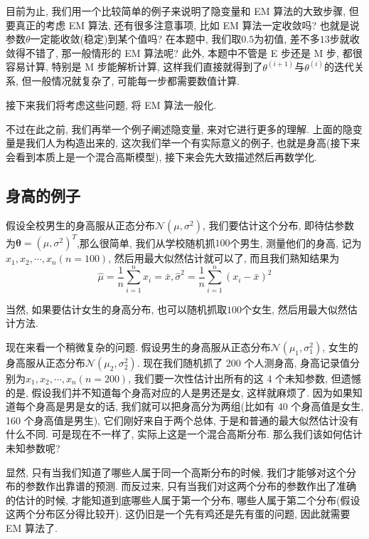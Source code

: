 \documentclass[a4paper,UTF8]{ctexart}
\theoremstyle{plain} \newtheorem{theorem}{定理}[section]
\theoremstyle{plain} \newtheorem{definition}{定义}[section]
\theoremstyle{plain} \newtheorem{lemma}{引理}[section]
\theoremstyle{plain} \newtheorem{proposition}{命题}[section]
\theoremstyle{plain} \newtheorem{example}{例}
\theoremstyle{plain} \newtheorem{remark}{注}
\theoremstyle{plain} \newtheorem{corollary}{推论}[section]
\begin{document}
目前为止, 我们用一个比较简单的例子来说明了隐变量和 EM 算法的大致步骤, 但要真正的考虑 EM 算法, 还有很多注意事项, 比如 EM 算法一定收敛吗? 也就是说参数$\theta$一定能收敛(稳定)到某个值吗? 在本题中, 我们取$0.5$为初值, 差不多$13$步就收敛得不错了, 那一般情形的 EM 算法呢? 此外, 本题中不管是 E 步还是 M 步, 都很容易计算, 特别是 M 步能解析计算, 这样我们直接就得到了$\theta^{(i + 1)}$与$\theta^{(i)}$的迭代关系, 但一般情况就复杂了, 可能每一步都需要数值计算.

接下来我们将考虑这些问题, 将 EM 算法一般化.

不过在此之前, 我们再举一个例子阐述隐变量, 来对它进行更多的理解. 上面的隐变量是我们人为构造出来的, 这次我们举一个有实际意义的例子, 也就是身高(接下来会看到本质上是一个混合高斯模型), 接下来会先大致描述然后再数学化.

\subsection{身高的例子}

假设全校男生的身高服从正态分布$\mathcal{N}(\mu, \sigma^{2})$, 我们要估计这个分布, 即待估参数为$\bm{\theta} = (\mu, \sigma^{2})^{T}$,那么很简单, 我们从学校随机抓$100$个男生, 测量他们的身高, 记为$x_{1}, x_{2}, \cdots, x_{n}(n=100)$, 然后用最大似然估计就可以了, 而且我们熟知结果为
\begin{equation*}
\hat{\mu} = \frac{1}{n} \sum_{i=1}^{n} x_{i} = \bar{x}, \hat{\sigma}^{2} = \frac{1}{n} \sum_{i=1}^{n} (x_{i}-\bar{x})^{2}
\end{equation*}

当然, 如果要估计女生的身高分布, 也可以随机抓取$100$个女生, 然后用最大似然估计方法.

现在来看一个稍微复杂的问题. 假设男生的身高服从正态分布$\mathcal{N}(\mu_{1}, \sigma_{1}^{2})$, 女生的身高服从正态分布$\mathcal{N}(\mu_{2}, \sigma_{2}^{2})$. 现在我们随机抓了 200 个人测身高, 身高记录值分别为$x_{1}, x_{2}, \cdots, x_{n}(n = 200)$, 我们要一次性估计出所有的这 4 个未知参数, 但遗憾的是, 假设我们并不知道每个身高对应的人是男还是女, 这样就麻烦了. 因为如果知道每个身高是男是女的话, 我们就可以把身高分为两组(比如有 40 个身高值是女生, 160 个身高值是男生), 它们刚好来自于两个总体, 于是和普通的最大似然估计没有什么不同. 可是现在不一样了, 实际上这是一个混合高斯分布. 那么我们该如何估计未知参数呢?

显然, 只有当我们知道了哪些人属于同一个高斯分布的时候, 我们才能够对这个分布的参数作出靠谱的预测. 而反过来, 只有当我们对这两个分布的参数作出了准确的估计的时候, 才能知道到底哪些人属于第一个分布, 哪些人属于第二个分布(假设这两个分布区分得比较开). 这仍旧是一个先有鸡还是先有蛋的问题, 因此就需要 EM 算法了.
\end{document}
